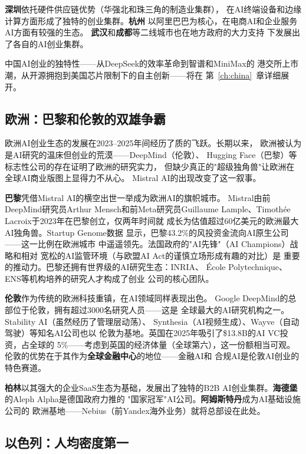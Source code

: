\textbf{深圳}依托硬件供应链优势（华强北和珠三角的制造业集群），
在AI终端设备和边缘计算方面形成了独特的创业集群。\textbf{杭州}
以阿里巴巴为核心，在电商AI和企业服务AI方面有较强的生态。
\textbf{武汉}和\textbf{成都}等二线城市也在地方政府的大力支持
下发展出了各自的AI创业集群。

中国AI创业的独特性——从DeepSeek的效率革命到智谱和MiniMax的
港交所上市潮，从开源拥抱到美国芯片限制下的自主创新——将在
第~\ref{ch:china}~章详细展开。

\subsection{欧洲：巴黎和伦敦的双雄争霸}

欧洲AI创业生态的发展在2023--2025年间经历了质的飞跃。长期以来，
欧洲被认为是AI研究的温床但创业的荒漠——DeepMind（伦敦）、
Hugging Face（巴黎）等标志性公司的存在证明了欧洲的研究实力，
但缺少真正的"超级独角兽"让欧洲在全球AI商业版图上显得力不从心。
Mistral AI的出现改变了这一叙事。

\textbf{巴黎}凭借Mistral AI的横空出世一举成为欧洲AI的旗帜城市。
Mistral由前DeepMind研究员Arthur Mensch和前Meta研究员Guillaume
Lample、Timoth\'{e}e Lacroix于2023年在巴黎创立，仅两年时间就
成长为估值超过60亿美元的欧洲最大AI独角兽。Startup Genome数据
显示，巴黎43.2\%的风投资金流向AI原生公司——这一比例在欧洲城市
中遥遥领先。法国政府的"AI先锋"（AI Champions）战略和相对
宽松的AI监管环境（与欧盟AI Act的谨慎立场形成有趣的对比）是
重要的推动力。巴黎还拥有世界级的AI研究生态：INRIA、
\'{E}cole Polytechnique、ENS等机构培养的研究人才构成了创业
公司的核心团队。

\textbf{伦敦}作为传统的欧洲科技重镇，在AI领域同样表现出色。
Google DeepMind的总部位于伦敦，拥有超过3000名研究人员——这是
全球最大的AI研究机构之一。Stability AI（虽然经历了管理层动荡）、
Synthesia（AI视频生成）、Wayve（自动驾驶）等知名AI公司也以
伦敦为基地。英国在2025年吸引了\$13.8B的AI VC投资，占全球的
5\%——考虑到英国的经济体量（全球第六），这一份额相当可观。
伦敦的优势在于其作为\textbf{全球金融中心}的地位——金融AI和
合规AI是伦敦AI创业的特色赛道。

\textbf{柏林}以其强大的企业SaaS生态为基础，发展出了独特的B2B
AI创业集群。\textbf{海德堡}的Aleph Alpha是德国政府力推的
"国家冠军"AI公司。\textbf{阿姆斯特丹}成为AI基础设施公司的
欧洲基地——Nebius（前Yandex海外业务）就将总部设在此处。

\subsection{以色列：人均密度第一}

